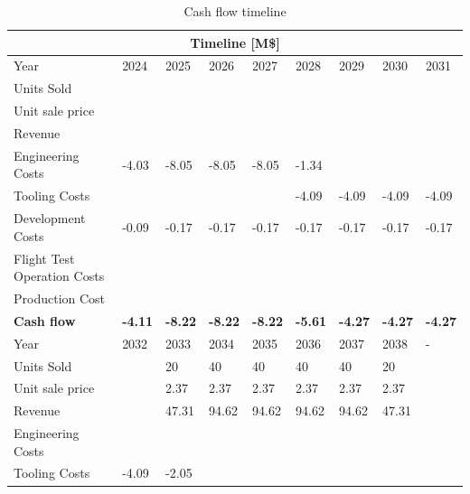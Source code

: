 \begin{table}[h]
\centering
\caption{Cash flow timeline}
\label{tab:cost:Cashflow:timeline}
\begin{tabular}{l|llllllll}
\multicolumn{9}{c}{Timeline {[}M\${]}}                                                            \\ \toprule
Year                        & 2024  & 2025   & 2026   & 2027   & 2028   & 2029   & 2030   & 2031  \\ \midrule
Units Sold                  &       &        &        &        &        &        &        &       \\
Unit sale price             &       &        &        &        &        &        &        &       \\
Revenue                     &       &        &        &        &        &        &        &       \\
Engineering Costs           & -4.03 & -8.05  & -8.05  & -8.05  & -1.34  &        &        &       \\
Tooling Costs               &       &        &        &        & -4.09  & -4.09  & -4.09  & -4.09 \\
Development Costs           & -0.09 & -0.17  & -0.17  & -0.17  & -0.17  & -0.17  & -0.17  & -0.17 \\
Flight Test Operation Costs &       &        &        &        &        &        &        &       \\
Production Cost             &       &        &        &        &        &        &        &       \\ \midrule
\textbf{Cash flow} & \textbf{-4.11} & \textbf{-8.22} & \textbf{-8.22} & \textbf{-8.22} & \textbf{-5.61} & \textbf{-4.27} & \textbf{-4.27} & \textbf{-4.27} \\ \midrule \midrule
Year                        & 2032  & 2033   & 2034   & 2035   & 2036   & 2037   & 2038   & -     \\ \midrule
Units Sold                  &       & 20     & 40     & 40     & 40     & 40     & 20     &       \\
Unit sale price             &       & 2.37   & 2.37   & 2.37   & 2.37   & 2.37   & 2.37   &       \\
Revenue                     &       & 47.31  & 94.62  & 94.62  & 94.62  & 94.62  & 47.31  &       \\
Engineering Costs           &       &        &        &        &        &        &        &       \\
Tooling Costs               & -4.09 & -2.05  &        &        &        &        &        &       \\

\end{tabular}
\end{table}
